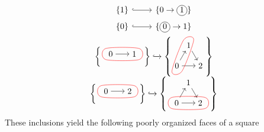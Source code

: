 \[
\begin{tabular}{cc}
     \begin{tikzcd}
         \{1\}
         \arrow[r, hook]
         &
         \{0 \to \circled{1}\}
     \end{tikzcd}
     \\
     \begin{tikzcd}
         \{0\}
         \arrow[r, hook]
         &
         \{\circled{0} \to 1\}
     \end{tikzcd}
     \\
     $
     \left\{
     \begin{tikzpicture}[baseline={(0,-0.2)}]
        \node (A) at (0,0) {$0$};
        \node (B) at (1,0) {$1$};
        \draw [->] (A) -- (B);
        \draw [red] plot [smooth cycle] coordinates {(A.north west) (A.south west) (B.south east) (B.north east) };
     \end{tikzpicture}
     \right\}
     \xhookrightarrow{}
     \left\{
     \begin{tikzpicture}[baseline={(0,0.3)}]
        \node (A) at (0,0.866) {$1$};
        \node (B) at (-0.5,0) {$0$};
        \node (C) at (0.5,0) {$2$};
        \draw [->] (A) -- (C);
        \draw [->] (B) -- (A);
        \draw [->] (B) -- (C);
        \draw [red] plot [smooth cycle] coordinates {(A.north west) (A.north east) (B.south east) (B.south west) };
    \end{tikzpicture}
     \right\}
     $
     \\
     $
     \left\{
     \begin{tikzpicture}[baseline={(0,-0.2)}]
        \node (A) at (0,0) {$0$};
        \node (B) at (1,0) {$2$};
        \draw [->] (A) -- (B);
        \draw [red] plot [smooth cycle] coordinates {(A.north west) (A.south west) (B.south east) (B.north east) };
     \end{tikzpicture}
     \right\}
     \xhookrightarrow{}
     \left\{
     \begin{tikzpicture}[baseline={(0,0.3)}]
        \node (A) at (0,0.866) {$1$};
        \node (B) at (-0.5,0) {$0$};
        \node (C) at (0.5,0) {$2$};
        \draw [->] (A) -- (C);
        \draw [->] (B) -- (A);
        \draw [->] (B) -- (C);
        \draw [red] plot [smooth cycle] coordinates {(B.north west) (B.south west) (C.south east) (C.north east) };
    \end{tikzpicture}
     \right\}
     $
\end{tabular}
\]
These inclusions yield the following poorly organized faces of a square
